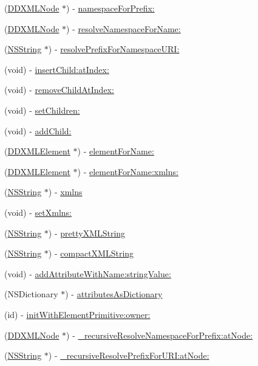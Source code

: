 \begin{DoxyCompactItemize}
(\hyperlink{interface_d_d_x_m_l_node}{DDXMLNode} $\ast$) -\/ \hyperlink{class_d_d_x_m_l_element_af104e0a24367ee5d80dc823ff1478fba}{namespaceForPrefix:}
\item 
(\hyperlink{interface_d_d_x_m_l_node}{DDXMLNode} $\ast$) -\/ \hyperlink{class_d_d_x_m_l_element_afd0fe95a6e828501ee207a5c692bc1e3}{resolveNamespaceForName:}
\item 
(\hyperlink{class_n_s_string}{NSString} $\ast$) -\/ \hyperlink{class_d_d_x_m_l_element_a2b4fa5b03afb01b8c379ffb711614019}{resolvePrefixForNamespaceURI:}
\item 
(void) -\/ \hyperlink{class_d_d_x_m_l_element_ab78a75bb3b6c2f3321bf4c8acb39b41d}{insertChild:atIndex:}
\item 
(void) -\/ \hyperlink{class_d_d_x_m_l_element_aa6bc2079078c24d43cc95937ac3c04bd}{removeChildAtIndex:}
\item 
(void) -\/ \hyperlink{class_d_d_x_m_l_element_a27b5fd6a5001e98ef1ab21c914dcd564}{setChildren:}
\item 
(void) -\/ \hyperlink{class_d_d_x_m_l_element_aeeb3826c19f1cc0509d8436c61ea4c26}{addChild:}
\item 
(\hyperlink{class_d_d_x_m_l_element}{DDXMLElement} $\ast$) -\/ \hyperlink{class_d_d_x_m_l_element_a07d653b036803ab01ec0cc6ed093e566}{elementForName:}
\item 
(\hyperlink{class_d_d_x_m_l_element}{DDXMLElement} $\ast$) -\/ \hyperlink{class_d_d_x_m_l_element_a22aa4e3343d528455683da8da7aa48d7}{elementForName:xmlns:}
\item 
(\hyperlink{class_n_s_string}{NSString} $\ast$) -\/ \hyperlink{class_d_d_x_m_l_element_aaa6f683fff1b13790bc35958ed198e3e}{xmlns}
\item 
(void) -\/ \hyperlink{class_d_d_x_m_l_element_a639df32cb3879409fe2941ef5655fe4c}{setXmlns:}
\item 
(\hyperlink{class_n_s_string}{NSString} $\ast$) -\/ \hyperlink{class_d_d_x_m_l_element_ad95d131bbd82beba4f69e713ed4e11de}{prettyXMLString}
\item 
(\hyperlink{class_n_s_string}{NSString} $\ast$) -\/ \hyperlink{class_d_d_x_m_l_element_a513554279bf1540388cfdce854728211}{compactXMLString}
\item 
(void) -\/ \hyperlink{class_d_d_x_m_l_element_a2a7ef778f931f0fa44e9992a67864957}{addAttributeWithName:stringValue:}
\item 
(NSDictionary $\ast$) -\/ \hyperlink{class_d_d_x_m_l_element_a945ca3ee8a11c606522baca7f7766211}{attributesAsDictionary}
\item 
(id) -\/ \hyperlink{class_d_d_x_m_l_element_a79d712d11aa8f735023fdb5b682765d8}{initWithElementPrimitive:owner:}
\item 
(\hyperlink{interface_d_d_x_m_l_node}{DDXMLNode} $\ast$) -\/ \hyperlink{class_d_d_x_m_l_element_acbb529f3c7f73cc7569eb9e33de5ff87}{\_\-recursiveResolveNamespaceForPrefix:atNode:}
\item 
(\hyperlink{class_n_s_string}{NSString} $\ast$) -\/ \hyperlink{class_d_d_x_m_l_element_a90f75ab79816e6938433e58b960f3922}{\_\-recursiveResolvePrefixForURI:atNode:}
\end{DoxyCompactItemize}
